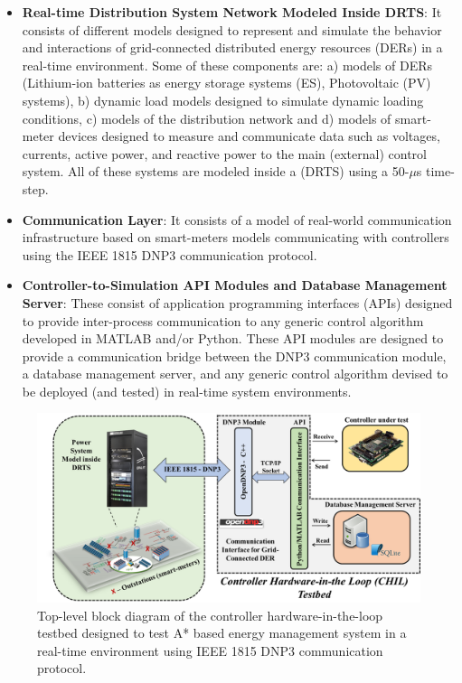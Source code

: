 \begin{itemize}
    \item \textbf{Real-time Distribution System Network Modeled Inside DRTS}: It consists of different models designed to represent and simulate the behavior and interactions of grid-connected distributed energy resources (DERs) in a real-time environment. Some of these components are: a) models of DERs (Lithium-ion batteries as energy storage systems (ES), Photovoltaic (PV) systems), b) dynamic load models designed to simulate dynamic loading conditions,  c) models of the distribution network and d) models of smart-meter devices designed to measure and communicate data such as voltages, currents, active power, and reactive power to the main (external) control system. All of these systems are modeled inside a (DRTS) using a 50-$\mu$s time-step.
    
    
    \item \textbf{Communication Layer}: It consists of a model of real-world communication infrastructure based on smart-meters models communicating with controllers using the IEEE 1815 DNP3 communication protocol. 
    
    
    \item \textbf{Controller-to-Simulation API Modules and Database Management Server}: These consist of application programming interfaces (APIs) designed to provide inter-process communication to any generic control algorithm developed in MATLAB and/or Python. These API modules are designed to provide a communication bridge between the DNP3 communication module, a database management server, and any generic control algorithm devised to be deployed (and tested) in real-time system environments.
\end{itemize}


\begin{figure}
\centering
  \includegraphics[width=\linewidth]{figs/overall_TB_2.png}
  \caption{Top-level block diagram of the controller hardware-in-the-loop testbed designed to test A* based energy management system in a real-time environment using IEEE 1815 DNP3 communication protocol.}
  \label{fig:overall_testbed}
\end{figure}


